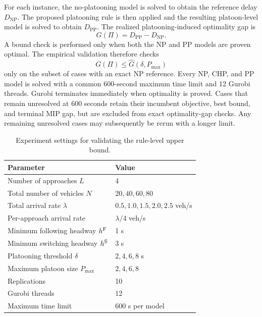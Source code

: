 For each instance, the no-platooning model is solved to obtain the reference delay \(D_{\mathrm{NP}}\). The proposed platooning rule is then applied and the resulting platoon-level model is solved to obtain \(D_{\mathrm{PP}}\). The realized platooning-induced optimality gap is
\begin{equation}
G(\Pi)=D_{\mathrm{PP}}-D_{\mathrm{NP}}.
\end{equation}
A bound check is performed only when both the NP and PP models are proven optimal. The empirical validation therefore checks
\begin{equation}
G(\Pi)\le \widehat G(\delta,P_{\max})
\end{equation}
only on the subset of cases with an exact NP reference. Every NP, CHP, and PP model is solved with a common 600-second maximum time limit and 12 Gurobi threads. Gurobi terminates immediately when optimality is proved. Cases that remain unresolved at 600 seconds retain their incumbent objective, best bound, and terminal MIP gap, but are excluded from exact optimality-gap checks. Any remaining unresolved cases may subsequently be rerun with a longer limit.

\begin{table}[t]
  \centering
  \caption{Experiment settings for validating the rule-level upper bound.}
  \label{tab:bound-setting}
  \begin{tabular}{ll}
    \toprule
    Parameter & Value \\
    \midrule
    Number of approaches \(L\) & 4 \\
    Total number of vehicles \(N\) & \(20,40,60,80\) \\
    Total arrival rate \(\lambda\) & \(0.5,1.0,1.5,2.0,2.5\) veh/s \\
    Per-approach arrival rate & \(\lambda/4\) veh/s \\
    Minimum following headway \(h^{\mathrm{F}}\) & 1 s \\
    Minimum switching headway \(h^{\mathrm{S}}\) & 3 s \\
    Platooning threshold \(\delta\) & \(2,4,6,8\) s \\
    Maximum platoon size \(P_{\max}\) & \(2,4,6,8\) \\
    Replications & 10 \\
    Gurobi threads & 12 \\
    Maximum time limit & 600 s per model \\
    \bottomrule
  \end{tabular}
\end{table}

